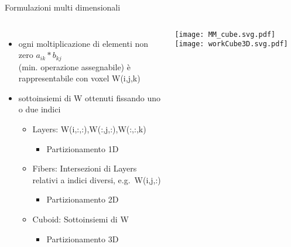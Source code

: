 \begin{frame} {Formulazioni multi dimensionali}
\begin{columns}
	\begin{itemize}
		\item	ogni moltiplicazione di elementi non zero $a_{ik} \ast b_{kj}$\\
				(min. operazione assegnabile) è rappresentabile con voxel W(i,j,k)
		\pause
		\item	sottoinsiemi di W ottenuti fissando uno o due indici
		\begin{itemize}
			\item	Layers: W(i,:,:),W(:,j,:),W(:,:,k)
			\begin{itemize}
				\item	Partizionamento 1D
			\end{itemize}
		\end{itemize}
		\begin{itemize}
			\item	Fibers: Intersezioni di Layers relativi a indici diversi, e.g. W(i,j,:)
			\begin{itemize}
				\item	Partizionamento 2D
			\end{itemize}
		\end{itemize}
		\begin{itemize}
			\item	Cuboid: Sottoinsiemi di W 	
			\begin{itemize}
				\item	Partizionamento 3D
			\end{itemize}
		\end{itemize}
	\end{itemize}
	\texttt{[image: MM\_cube.svg.pdf]}
	\voidLine
	\texttt{[image: workCube3D.svg.pdf]}
		
\end{columns}

\end{frame}

